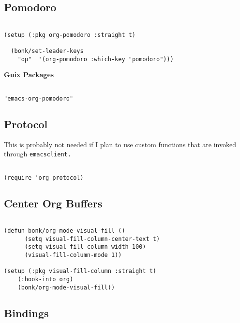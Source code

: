 \documentclass[11pt]{article}
\begin{document}
\subsection{Pomodoro}
\label{sec:orgd947148}

\begin{verbatim}

(setup (:pkg org-pomodoro :straight t)

  (bonk/set-leader-keys
    "op"  '(org-pomodoro :which-key "pomodoro")))

\end{verbatim}

\textbf{Guix Packages}

\begin{verbatim}

"emacs-org-pomodoro"

\end{verbatim}
\subsection{Protocol}
\label{sec:org4816c36}

This is probably not needed if I plan to use custom functions that are invoked
through \texttt{emacsclient.}

\begin{verbatim}

(require 'org-protocol)

\end{verbatim}
\subsection{Center Org Buffers}
\label{sec:orgdfc6688}
\begin{verbatim}

(defun bonk/org-mode-visual-fill ()
      (setq visual-fill-column-center-text t)
      (setq visual-fill-column-width 100)
      (visual-fill-column-mode 1))

(setup (:pkg visual-fill-column :straight t)
    (:hook-into org)
    (bonk/org-mode-visual-fill))

\end{verbatim}
\subsection{Bindings}
\label{sec:org0382bc7}
\end{document}

